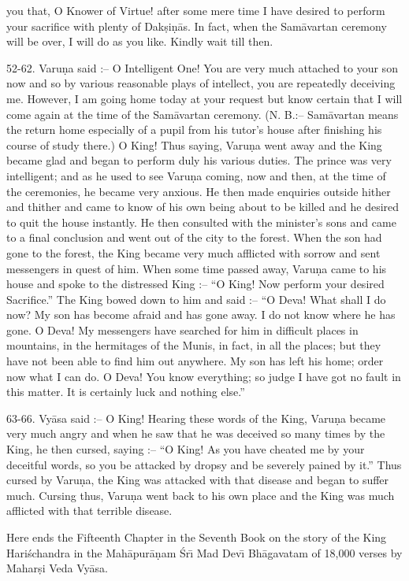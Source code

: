 you that, O Knower of Virtue! after some mere time I have desired to perform your sacrifice with plenty of Dak\d{s}i\d{n}\=as. In fact, when the Sam\=avartan ceremony will be over, I will do as you like. Kindly wait till then.

52-62. Varu\d{n}a said :-- O Intelligent One! You are very much attached to your son now and so by various reasonable plays of intellect, you are repeatedly deceiving me. However, I am going home today at your request but know certain that I will come again at the time of the Sam\=avartan ceremony. (N. B.:-- Sam\=avartan means the return home especially of a pupil from his tutor's house after finishing his course of study there.) O King! Thus saying, Varu\d{n}a went away and the King became glad and began to perform duly his various duties. The prince was very intelligent; and as he used to see Varu\d{n}a coming, now and then, at the time of the ceremonies, he became very anxious. He then made enquiries outside hither and thither and came to know of his own being about to be killed and he desired to quit the house instantly. He then consulted with the minister's sons and came to a final conclusion and went out of the city to the forest. When the son had gone to the forest, the King became very much afflicted with sorrow and sent messengers in quest of him. When some time passed away, Varu\d{n}a came to his house and spoke to the distressed King :-- ``O King! Now perform your desired Sacrifice.'' The King bowed down to him and said :-- ``O Deva! What shall I do now? My son has become afraid and has gone away. I do not know where he has gone. O Deva! My messengers have searched for him in difficult places in mountains, in the hermitages of the Munis, in fact, in all the places; but they have not been able to find him out anywhere. My son has left his home; order now what I can do. O Deva! You know everything; so judge I have got no fault in this matter. It is certainly luck and nothing else.''

63-66. Vy\=asa said :-- O King! Hearing these words of the King, Varu\d{n}a became very much angry and when he saw that he was deceived so many times by the King, he then cursed, saying :-- ``O King! As you have cheated me by your deceitful words, so you be attacked by dropsy and be severely pained by it.'' Thus cursed by Varu\d{n}a, the King was attacked with that disease and began to suffer much. Cursing thus, Varu\d{n}a went back to his own place and the King was much afflicted with that terrible disease.

Here ends the Fifteenth Chapter in the Seventh Book on the story of the King Hari\'schandra in the Mah\=apur\=a\d{n}am \'Sr\={\i} Mad Dev\={\i} Bh\=agavatam of 18,000 verses by Mahar\d{s}i Veda Vy\=asa.



